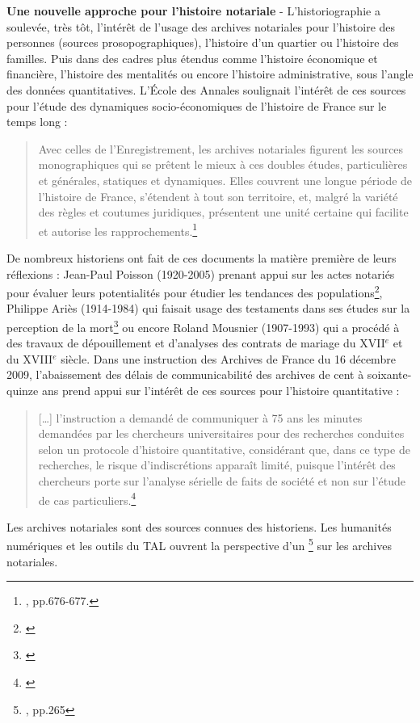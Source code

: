 \textbf{Une nouvelle approche pour l'histoire notariale} - L'historiographie a soulevée, très tôt, l'intérêt de l'usage des archives notariales pour l'histoire des personnes (sources prosopographiques), l'histoire d'un quartier ou l'histoire des familles. Puis dans des cadres plus étendus comme l'histoire économique et financière, l'histoire des mentalités ou encore l'histoire administrative, sous l'angle des données quantitatives. 
L'École des Annales soulignait l'intérêt de ces sources pour l'étude des dynamiques socio-économiques de l'histoire de France sur le temps long : 
\begin{quote}
    Avec celles de l'Enregistrement, les archives notariales figurent les sources monographiques qui se prêtent le mieux à ces doubles études, particulières et générales, statiques et dynamiques. Elles couvrent une longue période de l'histoire de France, s'étendent à tout son territoire, et, malgré la variété des règles et coutumes juridiques, présentent une unité certaine qui facilite et autorise les rapprochements.\footnote{\cite{daumard_methodes_1959}, pp.676-677.}
\end{quote}
De nombreux historiens ont fait de ces documents la matière première de leurs réflexions : Jean-Paul Poisson (1920-2005) prenant appui sur les actes notariés pour évaluer leurs potentialités pour étudier les tendances des populations\footnote{\cite{poisson_histoire_1974}}, Philippe Ariès (1914-1984) qui faisait usage des testaments dans ses études sur la perception de la mort\footnote{\cite{girard_aries_1978}} ou encore Roland Mousnier (1907-1993) qui a procédé à des travaux de dépouillement et d'analyses des contrats de mariage du XVII$^{e}$ et du XVIII$^{e}$ siècle. Dans une instruction des Archives de France du 16 décembre 2009, l'abaissement des délais de communicabilité des archives de cent à soixante-quinze ans prend appui sur l'intérêt de ces sources pour l'histoire quantitative : 
\newpage
\begin{quote}
    [\ldots] l'instruction a demandé de communiquer à 75 ans les minutes demandées par les chercheurs universitaires pour des recherches conduites selon un protocole d'histoire quantitative, considérant que, dans ce type de recherches, le risque d'indiscrétions apparaît limité, puisque l'intérêt des chercheurs porte sur l'analyse sérielle de faits de société et non sur l'étude de cas particuliers.\footnote{\cite{limon-bonnet_les_2013}}
\end{quote}
Les archives notariales sont des sources connues des historiens. Les humanités numériques et les outils du TAL ouvrent la perspective d'un \footnote{\cite{limon-bonnet_innovation_2019}, pp.265} sur les archives notariales. 
\\

